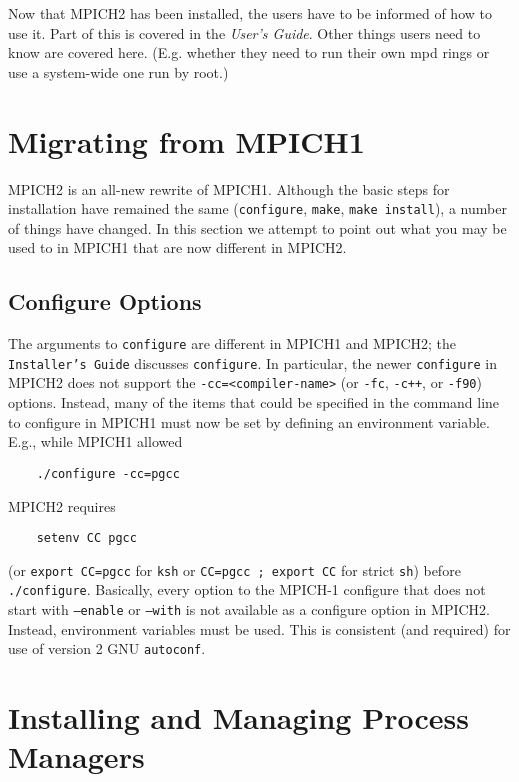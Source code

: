 \documentclass[dvipdfm,11pt]{article}
\begin{document}
Now that MPICH2 has been installed, the users have to be informed of how
to use it.  Part of this is covered in the \emph{User's Guide}.  Other
things users need to know are covered here.  (E.g. whether they need to
run their own mpd rings or use a system-wide one run by root.)


\section{Migrating from MPICH1}
\label{sec:migrating}

MPICH2 is an all-new rewrite of MPICH1.  Although the basic steps for
installation have remained the same (\texttt{configure}, \texttt{make},
\texttt{make install}), a number of things have changed.  In this
section we attempt to point out what you may be used to in MPICH1 that
are now different in MPICH2.

\subsection{Configure Options}
\label{sec:configure-options}

The arguments to \texttt{configure} are different in MPICH1 and MPICH2;
the \texttt{Installer's Guide} discusses \texttt{configure}.  In
particular, the newer \texttt{configure} in MPICH2 does not support the
\verb+-cc=<compiler-name>+ (or \texttt{-fc}, \texttt{-c++}, or
\texttt{-f90}) options.  Instead, many of the items that could be
specified in the command line to configure in MPICH1 must now be set by
defining an environment variable.  E.g., while MPICH1 allowed
\begin{verbatim}
    ./configure -cc=pgcc
\end{verbatim}
MPICH2 requires
\begin{verbatim}
    setenv CC pgcc
\end{verbatim}
(or \verb+export CC=pgcc+ for \texttt{ksh} or \verb+CC=pgcc ; export CC+
for strict \texttt{sh}) before \texttt{./configure}.  Basically, every
option to the MPICH-1 configure that does not start with
\texttt{--enable} or \texttt{--with} is not available as a configure
option in MPICH2.  Instead, environment variables must be used.  This is
consistent (and required) for use of version 2 GNU \texttt{autoconf}.


\section{Installing and Managing Process Managers}
\label{sec:process-managers}
\end{document}
